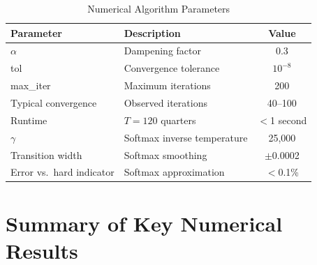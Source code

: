 \documentclass[11pt]{article}
\begin{document}
\begin{table}[htbp]
\centering
\caption{Numerical Algorithm Parameters}
\label{tab:algorithm_params}
\begin{tabular}{llc}
\toprule
Parameter & Description & Value \\
\midrule
$\alpha$ & Dampening factor & 0.3 \\
tol & Convergence tolerance & $10^{-8}$ \\
max\_iter & Maximum iterations & 200 \\
Typical convergence & Observed iterations & 40--100 \\
Runtime & $T = 120$ quarters & $<$1 second \\
\midrule
$\gamma$ & Softmax inverse temperature & 25,000 \\
Transition width & Softmax smoothing & $\pm$0.0002 \\
Error vs.\ hard indicator & Softmax approximation & $<$0.1\% \\
\bottomrule
\end{tabular}
\end{table}

\section{Summary of Key Numerical Results}
\label{sec:summary}
\end{document}
